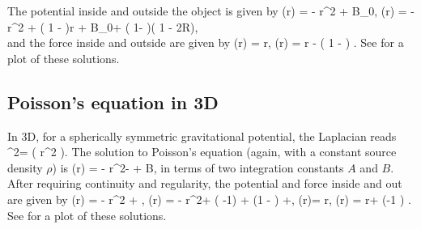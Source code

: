 \documentclass[a4paper, 12pt]{article}
\numberwithin{equation}{section}
\begin{document}
The potential inside and outside the object is given by
\bse
\label{poiss-soln-1}
\bea
{}(r) = - r^2 + B_0,
\eea
\bea
{}(r) = - r^2 +  \left( 1 - \right)\ln r + B_0+ \left( 1- \right)\left( 1 - 2\ln R\right),\nonumber\\
\eea
\ese
and the force inside and outside are given by
\bse
\label{poiss-soln-2}
\bea
{}(r) = r,
\eea
\bea
{}(r) =  r -   \left( 1 - \right)  .
\eea
\ese
See  for a plot of these solutions.
\subsection{Poisson's equation in 3D}
In 3D, for a spherically symmetric gravitational potential, the Laplacian reads
\bea
\nabla^2\Phi = \left( r^2 \right).
\eea
The solution to Poisson's equation (again, with a constant source density $\rho$) is 
\bea
\Phi(r) = -  r^2- + B,
\eea
in terms of two integration constants $A$ and $B$.   After requiring  continuity and regularity, the potential and force inside and out are given by
\bse
\label{poiss-soln-3}
\bea
{}(r) = -  r^2 + ,
\eea
\bea
{}(r) = -  r^2+  \left( -1\right) + \left(1 - \right)  +,
\eea
\ese
\bse
\label{poiss-soln-4}
\bea
{} (r)=   r,
\eea
\bea
{}(r) =  r+ \left(-1 \right)   .
\eea
\ese
See  for a plot of these solutions.
\end{document}
